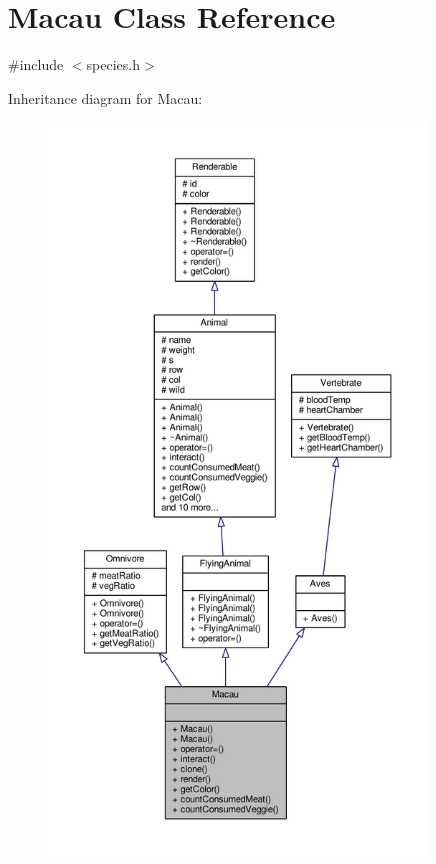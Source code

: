\hypertarget{classMacau}{}\section{Macau Class Reference}
\label{classMacau}


{\ttfamily \#include $<$species.\+h$>$}



Inheritance diagram for Macau\+:
\nopagebreak
\begin{figure}[H]
\begin{center}
\leavevmode
\includegraphics[height=550pt]{classMacau__inherit__graph}
\end{center}
\end{figure}


